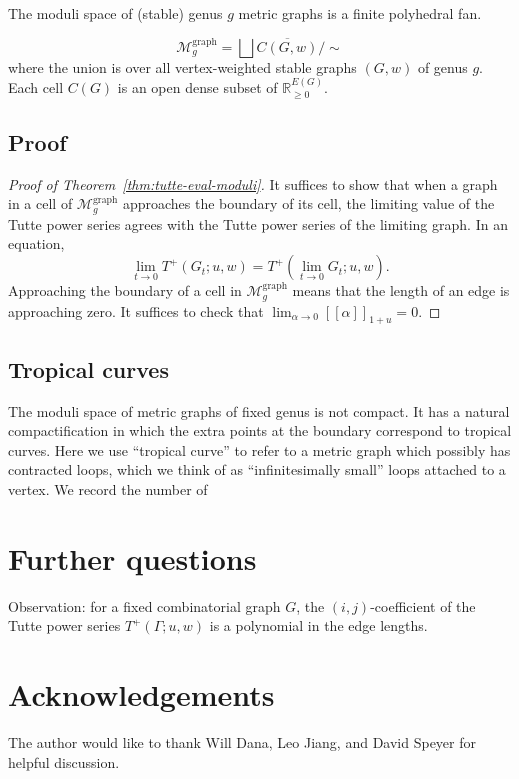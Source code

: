 \documentclass{amsart}
\theoremstyle{definition}
\newcommand{\RR}{\mathbb{R}}
\newcommand{\RRnneg}{\RR_{\geq 0}}
\newcommand{\fanalog}[2]{[\![#2]\!]_{#1}}
\newcommand{\ufanalog}[1]{\fanalog{1 + u}{#1}}
\newcommand{\Mgraphg}{\mathcal M_g^{\mathrm{graph}}}
\newcommand{\Mggraph}{\Mgraphg}
\newcommand{\harry}[1]{{\color{red} \sf $\diamondsuit$ {#1} $\diamondsuit$ }}
\newcommand{\note}[1]{\harry{#1}}
\begin{document}
The moduli space of (stable) genus $g$ metric graphs is a finite polyhedral fan.


\[
	\Mggraph = \bigsqcup \overline{C(G, w)} / \sim
\]
where the union is over all vertex-weighted stable graphs $(G, w)$ of genus $g$.
Each cell $C(G)$ is an open dense subset of $\RRnneg^{E(G)}$.


\subsection{Proof}
\begin{proof}[Proof of Theorem~\ref{thm:tutte-eval-moduli}]
It suffices to show that when a graph in a cell of $\Mggraph$ approaches the boundary of its cell, the limiting value of the Tutte power series agrees with the Tutte power series of the limiting graph.
In an equation,
\[
	\lim_{t \to 0} T^+(G_t; u, w) = T^+(\lim_{t \to 0} G_t; u, w).
\]
Approaching the boundary of a cell in $\Mggraph$ means that the length of an edge is approaching zero.
It suffices to check that $\lim_{\alpha \to 0} \ufanalog{\alpha} = 0$.
\end{proof}

\subsection{Tropical curves}

The moduli space of metric graphs of fixed genus is not compact. 
It has a natural compactification in which the extra points at the boundary correspond to tropical curves.
Here we use ``tropical curve'' 
to refer to a metric graph which possibly has contracted loops,
which we think of as ``infinitesimally small'' loops attached to a vertex.
We record the number of 


\section{Further questions}

Observation: for a fixed combinatorial graph $G$, the $(i,j)$-coefficient of the Tutte power series $T^+(\Gamma; u,w)$ is a polynomial in the edge lengths.

\section*{Acknowledgements}
The author would like to thank 
Will Dana, Leo Jiang, and
David Speyer for helpful discussion.
\end{document}
